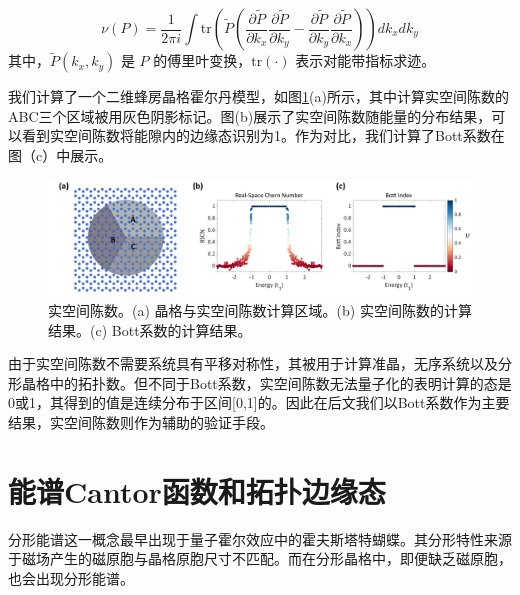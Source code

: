 \begin{equation}
\nu(P) = \frac{1}{2\pi i} \int \text{tr} \left( \tilde{P} \left( \frac{\partial \tilde{P}}{\partial k_x} \frac{\partial \tilde{P}}{\partial k_y} - \frac{\partial \tilde{P}}{\partial k_y} \frac{\partial \tilde{P}}{\partial k_x} \right) \right) dk_x dk_y
\end{equation}
其中，\(\tilde{P}(k_x, k_y)\) 是 \(P\) 的傅里叶变换，\(\text{tr}(\cdot)\) 表示对能带指标求迹。

我们计算了一个二维蜂房晶格霍尔丹模型，如图\ref{fig:RSCN}(a)所示，其中计算实空间陈数的ABC三个区域被用灰色阴影标记。图(b)展示了实空间陈数随能量的分布结果，可以看到实空间陈数将能隙内的边缘态识别为1。作为对比，我们计算了Bott系数在图（c）中展示。
\begin{figure}[htbp]
    \centering
    \includegraphics[width=1\linewidth]{figure/FracHaldTheo/RSCN.png}
    \caption{实空间陈数。(a) 晶格与实空间陈数计算区域。(b) 实空间陈数的计算结果。(c) Bott系数的计算结果。}
    \label{fig:RSCN}
\end{figure}
由于实空间陈数不需要系统具有平移对称性，其被用于计算准晶\cite{mitchell2018amorphous}，无序系统以及分形晶格\cite{yang2020photonic}中的拓扑数。但不同于Bott系数，实空间陈数无法量子化的表明计算的态是0或1，其得到的值是连续分布于区间[0,1]的。因此在后文我们以Bott系数作为主要结果，实空间陈数则作为辅助的验证手段。

\section{能谱Cantor函数和拓扑边缘态}
分形能谱这一概念最早出现于量子霍尔效应中的霍夫斯塔特蝴蝶\cite{hofstadter1976energy}。其分形特性来源于磁场产生的磁原胞与晶格原胞尺寸不匹配。而在分形晶格中，即便缺乏磁原胞，也会出现分形能谱。

